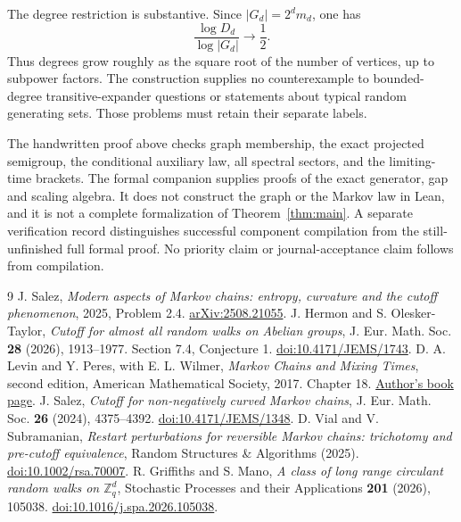 \documentclass[11pt]{article}
\theoremstyle{remark}\newtheorem{remark}[theorem]{Remark}
\begin{document}
The degree restriction is substantive. Since $|G_d|=2^dm_d$, one has
\[
 \frac{\log D_d}{\log|G_d|}\longrightarrow\frac12.
\]
Thus degrees grow roughly as the square root of the number of vertices, up to subpower factors. The construction supplies no counterexample to bounded-degree transitive-expander questions or statements about typical random generating sets. Those problems must retain their separate labels.

The handwritten proof above checks graph membership, the exact projected semigroup, the conditional auxiliary law, all spectral sectors, and the limiting-time brackets. The formal companion supplies proofs of the exact generator, gap and scaling algebra. It does not construct the graph or the Markov law in Lean, and it is not a complete formalization of Theorem~\ref{thm:main}. A separate verification record distinguishes successful component compilation from the still-unfinished full formal proof. No priority claim or journal-acceptance claim follows from compilation.

\begingroup\small
\begin{thebibliography}{9}
 J. Salez, \emph{Modern aspects of Markov chains: entropy, curvature and the cutoff phenomenon}, 2025, Problem 2.4.
\href{https://arxiv.org/abs/2508.21055}{arXiv:2508.21055}.
 J. Hermon and S. Olesker-Taylor, \emph{Cutoff for almost all random walks on Abelian groups}, J. Eur. Math. Soc. \textbf{28} (2026), 1913--1977. Section 7.4, Conjecture 1.
\href{https://doi.org/10.4171/JEMS/1743}{doi:10.4171/JEMS/1743}.
 D. A. Levin and Y. Peres, with E. L. Wilmer, \emph{Markov Chains and Mixing Times}, second edition, American Mathematical Society, 2017. Chapter 18.
\href{https://pages.uoregon.edu/dlevin/MARKOV/}{Author's book page}.
 J. Salez, \emph{Cutoff for non-negatively curved Markov chains}, J. Eur. Math. Soc. \textbf{26} (2024), 4375--4392.
\href{https://doi.org/10.4171/JEMS/1348}{doi:10.4171/JEMS/1348}.
 D. Vial and V. Subramanian, \emph{Restart perturbations for reversible Markov chains: trichotomy and pre-cutoff equivalence}, Random Structures \& Algorithms (2025).
\href{https://doi.org/10.1002/rsa.70007}{doi:10.1002/rsa.70007}.
 R. Griffiths and S. Mano, \emph{A class of long range circulant random walks on $\mathbb Z_q^d$}, Stochastic Processes and their Applications \textbf{201} (2026), 105038.
\href{https://doi.org/10.1016/j.spa.2026.105038}{doi:10.1016/j.spa.2026.105038}.
\end{thebibliography}\endgroup
\end{document}
